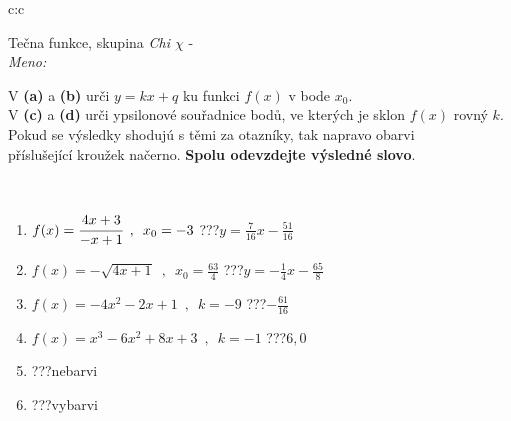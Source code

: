 \documentclass[10pt]{report}
\begin{document}
\newpage
\thispagestyle{empty}
\begin{tabular}{c:c}
\begin{minipage}[c][104.5mm][t]{0.5\linewidth}
\begin{center}
\vspace{7mm}
{\huge Tečna funkce, skupina \textit{Chi $\chi$} -}\\[5mm]
\textit{Meno:}\phantom{xxxxxxxxxxxxxxxxxxxxxxxxxxxxxxxxxxxxxxxxxxxxxxxxxxxxxxxxxxxxxxxxx}\\[5mm]
\begin{minipage}{0.95\linewidth}
\begin{center}
V \textbf{(a)} a \textbf{(b)} urči  $y = kx + q$ ku funkci $f(x)$ v bode $x_0$.\\V \textbf{(c)} a \textbf{(d)} urči ypsilonové souřadnice bodů, ve kterých je sklon $f(x)$ rovný $k$.\\Pokud se výsledky shodujú s těmi za otazníky, tak napravo obarvi\\příslušející kroužek načerno. \textbf{Spolu odevzdejte výsledné slovo}.
\end{center}
\end{minipage}
\\[1mm]
\begin{minipage}{0.79\linewidth}
\begin{center}
\begin{varwidth}{\linewidth}
\begin{enumerate}
\small
\item $f(x)=\cfrac{4x+3}{-x+1}\enspace , \enspace x_0=-3$\quad \dotfill\; ???\;\dotfill \quad $y = \frac{7}{16}x-\frac{51}{16}$
\item $f(x)=-\sqrt{4x+1}\enspace , \enspace x_0=\frac{63}{4}$\quad \dotfill\; ???\;\dotfill \quad $y = -\frac{1}{4}x-\frac{65}{8}$
\item $f(x)=-4x^2-2x+1\enspace , \enspace k=-9$\quad \dotfill\; ???\;\dotfill \quad $-\frac{61}{16}$
\item $f(x)=x^3-6x^2+8x+3\enspace , \enspace k=-1$\quad \dotfill\; ???\;\dotfill \quad $6 , 0$
\item \quad \dotfill\; ???\;\dotfill \quad nebarvi
\item \quad \dotfill\; ???\;\dotfill \quad vybarvi
\end{enumerate}
\end{varwidth}
\end{center}
\end{minipage}
\begin{minipage}{0.20\linewidth}

\end{minipage}
\end{center}
\end{minipage}
\end{tabular}
\end{document}
